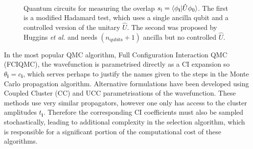 \documentclass[%
 reprint,
 amsmath,amssymb,
 aps,
]{revtex4-2}
\begin{document}
\begin{figure}
    \centering
{}\\
    \caption{\small \justifying Quantum circuits for measuring the overlap $s_\mathrm{i} = \braket{\phi_\mathbf{i}|\hat U \phi_0}$. The first is a modified Hadamard test,\cite{quantumalgorithms} which uses a single ancilla qubit and a controlled version of the unitary $\hat U$. The second was proposed by Huggins \textit{et al.}\cite{Huggins2020} and needs $(n_\mathrm{qubits} + 1)$ ancilla but no controlled $\hat U$.}
    \label{fig:circs}
\end{figure}

In the most popular QMC algorithm, Full Configuration Interaction QMC (FCIQMC),\cite{Booth2009} the wavefunction is parametrised directly as a CI expansion so $\theta_\mathbf{i} = c_\mathbf{i}$, which serves perhaps to justify the names given to the steps in the Monte Carlo propagation algorithm. Alternative formulations have been developed using Coupled Cluster (CC)\cite{Thom2010} and UCC\cite{Filip2020} parametrisations of the wavefunction. These methods use very similar propagators, however  one only has access to the cluster amplitudes $t_\mathbf{i}$. Therefore the corresponding CI coefficients must also be sampled stochastically, leading to additional complexity in the selection algorithm, which is responsible for a significant portion of the computational cost of these algorithms. 
\end{document}
